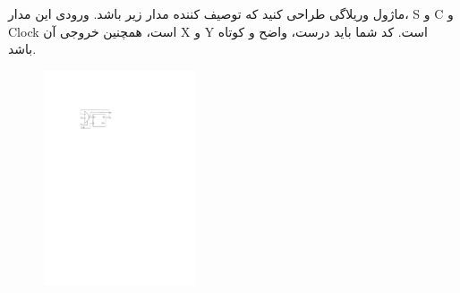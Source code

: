 

ماژول وریلاگی طراحی کنید که توصیف کننده مدار زیر باشد. ورودی این مدار، S و C و Clock است، همچنین خروجی آن X و Y است. کد شما باید درست، واضح و کوتاه باشد.

\begin{figure}[h]
	\centering
	\includegraphics[width=0.4\textwidth]{fig/Q_bunos_2.pdf}
	\label{fig:Q_bunos_2}
\end{figure}

